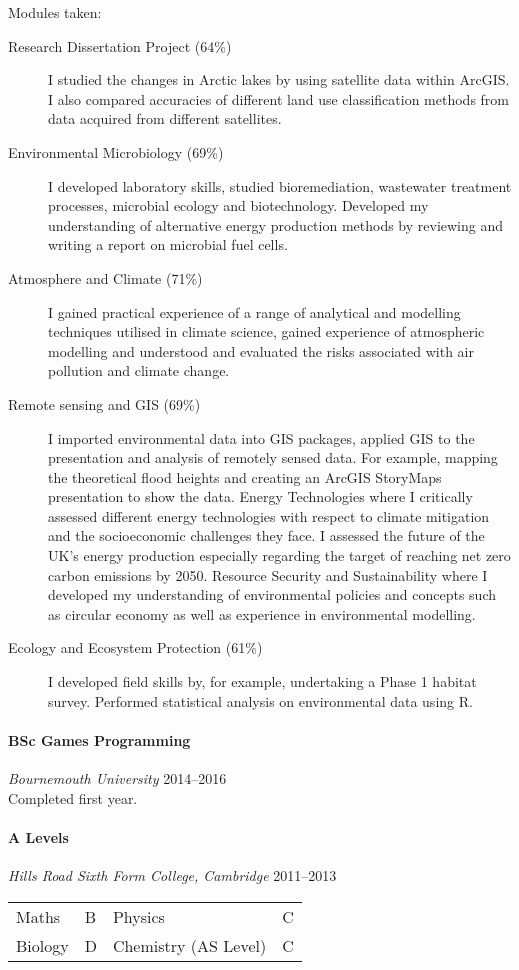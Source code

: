 \documentclass[11pt,a4paper]{article}
\newcommand{\centry}[3]{\paragraph{#1} \textit{#2}%
\hfill#3\\[2pt]}
\begin{document}
Modules taken:
\begin{description}
\item[Research Dissertation Project (64\%)] I studied the changes in Arctic
  lakes by using satellite data within ArcGIS. I also compared accuracies of
  different land use classification methods from data acquired from different
  satellites.  
\item[Environmental Microbiology (69\%)] I developed laboratory skills, studied
  bioremediation, wastewater treatment processes, microbial ecology and
  biotechnology. Developed my understanding of alternative energy production
  methods by reviewing and writing a report on microbial fuel cells.
\item[Atmosphere and Climate (71\%)]  I gained practical experience of a range of
  analytical and modelling techniques utilised in climate science, gained
  experience of atmospheric modelling and understood and evaluated the risks
  associated with air pollution and climate change.
\item[Remote sensing and GIS (69\%)] I imported environmental data into GIS
  packages, applied GIS to the presentation and analysis of remotely sensed
  data. For example, mapping the theoretical flood heights and creating an
  ArcGIS StoryMaps presentation to show the data.  Energy Technologies where I
  critically assessed different energy technologies with respect to climate
  mitigation and the socioeconomic challenges they face. I assessed the future
  of the UK’s energy production especially regarding the target of reaching net
  zero carbon emissions by 2050.  Resource Security and Sustainability where I
  developed my understanding of environmental policies and concepts such as
  circular economy as well as experience in environmental modelling. 
\item[Ecology and Ecosystem Protection (61\%)] I developed field skills by, for
  example, undertaking a Phase 1 habitat survey. Performed statistical analysis
  on environmental data using R.
\end{description}


\centry{BSc Games Programming}{Bournemouth University}{2014--2016}
Completed first year.

\centry{A Levels}{Hills Road Sixth Form College, Cambridge} {2011--2013}
\begin{center}
  \begin{tabular}{llll}
    Maths & B & Physics & C \\
    Biology & D  & Chemistry (AS Level) & C\\
  \end{tabular}
\end{center}
\end{document}
